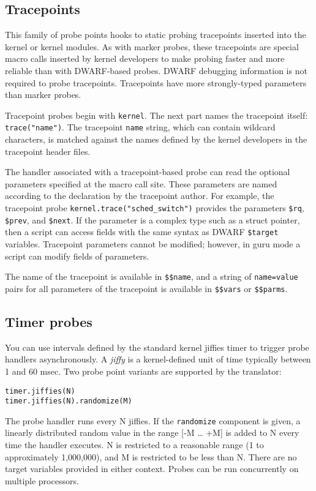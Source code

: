 \documentclass[twoside,english]{article}
\newenvironment{vindent}
{\begin{list}{}{\setlength{\listparindent}{6pt}}
\item[]}
{\end{list}}
\begin{document}
\subsection{Tracepoints}
\label{sec:tracepoints}

This family of probe points hooks to static probing tracepoints
inserted into the kernel or kernel modules.  As with marker probes,
these tracepoints are special macro calls inserted by kernel
developers to make probing faster and more reliable than with
DWARF-based probes.  DWARF debugging information is not required to
probe tracepoints.  Tracepoints have more strongly-typed parameters
than marker probes.

Tracepoint probes begin with \texttt{kernel}.  The next part names the
tracepoint itself: \texttt{trace("name")}.  The tracepoint
\texttt{name} string, which can contain wildcard characters, is
matched against the names defined by the kernel developers in the
tracepoint header files.

The handler associated with a tracepoint-based probe can read the
optional parameters specified at the macro call site.  These
parameters are named according to the declaration by the tracepoint
author.  For example, the tracepoint probe
\texttt{kernel.trace("sched\_switch")} provides the parameters
\texttt{\$rq}, \texttt{\$prev}, and \texttt{\$next}.  If the parameter
is a complex type such as a struct pointer, then a script can access
fields with the same syntax as DWARF \texttt{\$target} variables.
Tracepoint parameters cannot be modified; however, in guru mode a
script can modify fields of parameters.

The name of the tracepoint is available in \texttt{\$\$name}, and a
string of \texttt{name=value} pairs for all parameters of the
tracepoint is available in \texttt{\$\$vars} or \texttt{\$\$parms}.


\subsection{Timer probes}
You can use intervals defined by the standard kernel jiffies
timer to trigger probe handlers asynchronously. A \emph{jiffy} is a kernel-defined
unit of time typically between 1 and 60 msec. Two probe point variants are
supported by the translator:

\begin{vindent}
\begin{verbatim}
timer.jiffies(N)
timer.jiffies(N).randomize(M)
\end{verbatim}
\end{vindent}
The probe handler runs every N jiffies. If the \texttt{randomize}
component is given, a linearly distributed random value in the range {[}-M
\ldots{} +M] is added to N every time the handler executes. N is restricted
to a reasonable range (1 to approximately 1,000,000), and M is restricted
to be less than N. There are no target variables provided in either context.
Probes can be run concurrently on multiple processors.
\end{document}
